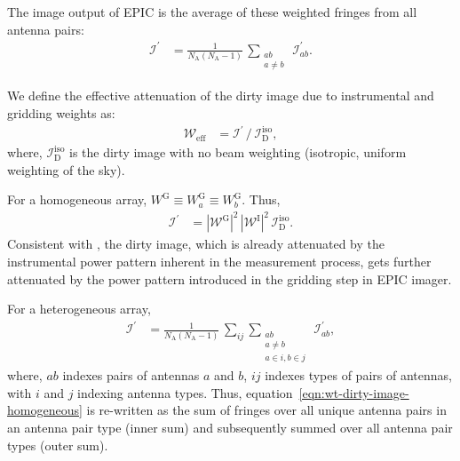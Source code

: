 \documentclass[a4paper,fleqn,usenatbib]{mnras}
\newcommand{\Nant}{N_\textrm{A}}
\begin{document}
The image output of EPIC is the average of these weighted fringes from all antenna pairs:
\begin{align}\label{eqn:wt-dirty-image-EPIC}
  \mathcal{I}^\prime &= \frac{1}{\Nant(\Nant-1)}\,\sum_{\substack{ab\\a\ne b}}\,\mathcal{I}^\prime_{ab}.
\end{align}

We define the effective attenuation of the dirty image due to instrumental and gridding weights as:
\begin{align}\label{eqn:effective-weighting}
  \mathcal{W}_\textrm{eff} &= \mathcal{I}^\prime\, / \,\mathcal{I}_\textrm{D}^\textrm{iso},
\end{align}
where, $\mathcal{I}_\textrm{D}^\textrm{iso}$ is the dirty image with no beam weighting (isotropic, uniform weighting of the sky).

For a homogeneous array, $W^\textrm{G} \equiv W^\textrm{G}_a \equiv W^\textrm{G}_b$. Thus,  
\begin{align}\label{eqn:wt-dirty-image-homogeneous}
  \mathcal{I}^\prime &= \left|\mathcal{W}^\textrm{G}\right|^2\,\left|\mathcal{W}^\textrm{I}\right|^2\,\mathcal{I}_\textrm{D}^\textrm{iso}.
\end{align}
Consistent with \citet{mor09}, the dirty image, which is already attenuated by the instrumental power pattern inherent in the measurement process, gets further attenuated by the power pattern introduced in the gridding step in EPIC imager.

For a heterogeneous array, 
\begin{align}\label{eqn:wt-dirty-image-EPIC-decomp}
  \mathcal{I}^\prime &= \frac{1}{\Nant(\Nant-1)}\,\sum_{ij}\sum_{\substack{ab\\a\ne b\\a\in i, b\in j}}\,\mathcal{I}^\prime_{ab},
\end{align}
where, $ab$ indexes pairs of antennas $a$ and $b$, $ij$ indexes types of pairs of antennas, with $i$ and $j$ indexing antenna types. Thus, equation~\ref{eqn:wt-dirty-image-homogeneous} is re-written as the sum of fringes over all unique antenna pairs in an antenna pair type (inner sum) and subsequently summed over all antenna pair types (outer sum). 
\end{document}
